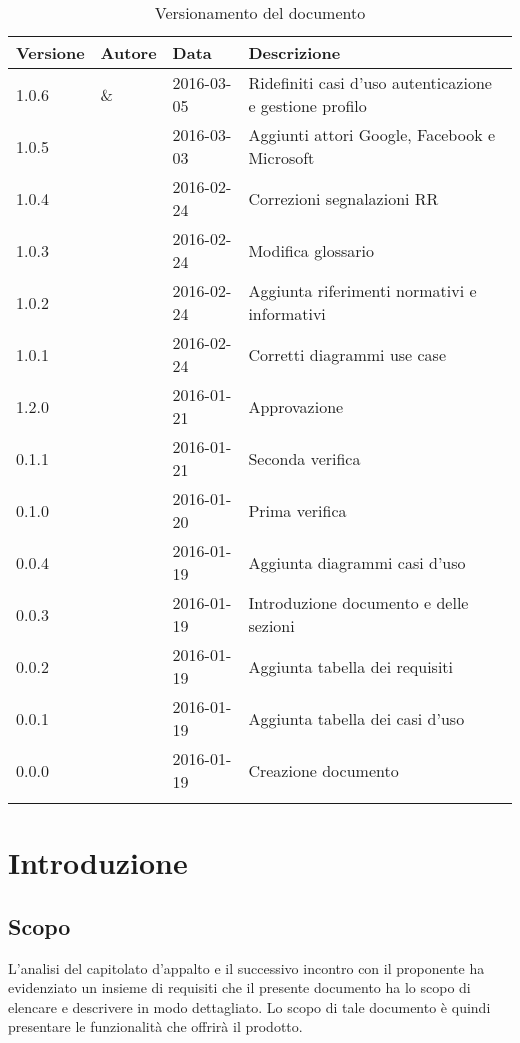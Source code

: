 \documentclass[12pt,a4paper]{article}
\begin{document}
\begin{center}
	\begin{longtable}[H]{p{} p{} p{} p{}}
		\toprule
		\textbf{Versione}	&	\textbf{Autore}	&	\textbf{Data}	&	\textbf{Descrizione}\\*
		\midrule
		\midrule
        1.0.6 & \TP{} \& \AVE{} & 2016-03-05 & Ridefiniti casi d'uso autenticazione e gestione profilo \\*
		\midrule
		1.0.5 & \TP{} & 2016-03-03 & Aggiunti attori Google, Facebook e Microsoft \\*
		\midrule
		1.0.4 & \AVI{} & 2016-02-24 &  Correzioni segnalazioni RR \\*
		\midrule
		1.0.3 & \IB{} & 2016-02-24 &  Modifica glossario \\*
		\midrule
		1.0.2 & \IB{} & 2016-02-24 &  Aggiunta riferimenti normativi e informativi \\*
		\midrule
		1.0.1 & \NDC{} & 2016-02-24 &  Corretti diagrammi use case \\*
		\midrule
		1.2.0 & \NDC{} & 2016-01-21 &  Approvazione \\*
		\midrule
		0.1.1 & \IB{} & 2016-01-21 &  Seconda verifica \\*
		\midrule
		0.1.0 & \AVI{} & 2016-01-20 &  Prima verifica \\*
		\midrule
		0.0.4 & \TP{} & 2016-01-19 & Aggiunta diagrammi casi d'uso\\*
		\midrule
		0.0.3 & \AVE{} & 2016-01-19 &  Introduzione documento e delle sezioni  \\*
		\midrule
		0.0.2 & \AB{} & 2016-01-19 &  Aggiunta tabella dei requisiti \\*
		\midrule
		0.0.1 & \WS{} & 2016-01-19 &  Aggiunta tabella dei casi d'uso \\*
		\midrule
		0.0.0 & \NDC{} & 2016-01-19 &  Creazione documento \\*
		\bottomrule
		\caption{Versionamento del documento}
		\label{tabVers1}
	\end{longtable}
\end{center}

\newpage
\tableofcontents
\newpage
\listoftables
\listoffigures
\newpage

\section{Introduzione}

\subsection{Scopo}
L’analisi del capitolato d’appalto e il successivo incontro con il proponente ha evidenziato un insieme di requisiti che il presente documento ha lo scopo di elencare e descrivere in modo dettagliato. Lo scopo di tale documento è quindi presentare le funzionalità che offrirà il prodotto.
\end{document}
